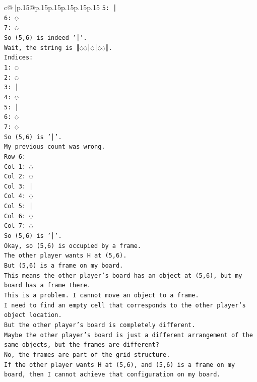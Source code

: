\documentclass{article}
\begin{document}
{\begin{supertabular}{c@{$\;$}|p{.15\linewidth}@{}p{.15\linewidth}p{.15\linewidth}p{.15\linewidth}p{.15\linewidth}p{.15\linewidth}}
{{{\texttt{5: │} \\
\texttt{6: ◌} \\
\texttt{7: ◌} \\
\texttt{So (5,6) is indeed '│'.} \\
\texttt{Wait, the string is ║◌◌│◌│◌◌║.} \\
\texttt{Indices:} \\
\texttt{1: ◌} \\
\texttt{2: ◌} \\
\texttt{3: │} \\
\texttt{4: ◌} \\
\texttt{5: │} \\
\texttt{6: ◌} \\
\texttt{7: ◌} \\
\texttt{So (5,6) is '│'.} \\
\texttt{My previous count was wrong.} \\
\texttt{Row 6:} \\
\texttt{Col 1: ◌} \\
\texttt{Col 2: ◌} \\
\texttt{Col 3: │} \\
\texttt{Col 4: ◌} \\
\texttt{Col 5: │} \\
\texttt{Col 6: ◌} \\
\texttt{Col 7: ◌} \\
\texttt{So (5,6) is '│'.} \\
\texttt{Okay, so (5,6) is occupied by a frame.} \\
\texttt{The other player wants H at (5,6).} \\
\texttt{But (5,6) is a frame on my board.} \\
\texttt{This means the other player's board has an object at (5,6), but my board has a frame there.} \\
\texttt{This is a problem. I cannot move an object to a frame.} \\
\texttt{I need to find an empty cell that corresponds to the other player's object location.} \\
\texttt{But the other player's board is completely different.} \\
\texttt{Maybe the other player's board is just a different arrangement of the same objects, but the frames are different?} \\
\texttt{No, the frames are part of the grid structure.} \\
\texttt{If the other player wants H at (5,6), and (5,6) is a frame on my board, then I cannot achieve that configuration on my board.} \\
}}}
\end{supertabular}}
\end{document}
